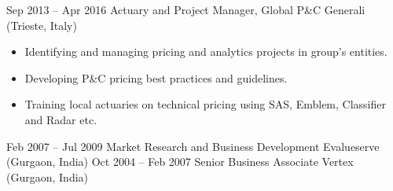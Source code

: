 \documentclass[a4paper,]{fortysecondscv}
\begin{document}
\begin{cvtable}
{\begin{itemize}[nosep, leftmargin=0pt]
\begin{itemize}
                  \end{itemize}
        \end{itemize}
    }
    \vspace{\topsep}
    \cvitem
    {Sep 2013 -- Apr 2016}
    {Actuary and Project Manager, Global P\&C}
    {Generali (Trieste, Italy)}
    {
        \vspace{-\topsep}
        \begin{itemize}[nosep, leftmargin=0pt] %
            \item Identifying and managing pricing and analytics projects in group's entities.
            \item Developing P\&C pricing best practices and guidelines.
            \item Training local actuaries on technical pricing using SAS, Emblem, Classifier and Radar etc.
        \end{itemize}
    }
    \vspace{\topsep}
    \cvitem
    {Feb 2007 -- Jul 2009}
    {Market Research and Business Development}
    {Evalueserve (Gurgaon, India)}
    {
    }
    \vspace{\topsep}
    \cvitem
    {Oct 2004 -- Feb 2007}
    {Senior Business Associate}
    {Vertex (Gurgaon, India)}
    {
    }
\end{cvtable}


\end{document}
